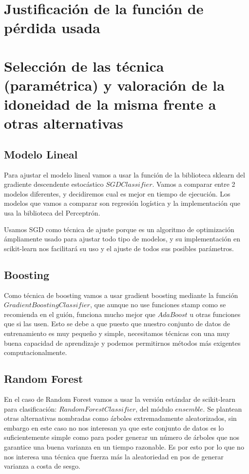 \documentclass{article}
\begin{document}
	
	\section{Justificación de la función de pérdida usada} %
	
	
	
	\section{Selección de las técnica (paramétrica) y valoración de la idoneidad de la misma frente a otras alternativas} %
	\subsection{Modelo Lineal}
	Para ajustar el modelo lineal vamos a usar la función de la biblioteca sklearn del gradiente descendente estocástico $SGDClassifier$. Vamos a comparar entre 2 modelos diferentes, y decidiremos cual es mejor en tiempo de ejecución. Los modelos que vamos a comparar son regresión logística y la implementación que usa la biblioteca del Perceptrón.
	\par 
	Usamos SGD como técnica	de ajuste porque es un algoritmo de optimización ámpliamente usado para ajustar todo tipo de modelos, y su implementación en scikit-learn nos facilitará su uso y el ajuste de todos sus posibles parámetros. 
	\subsection{Boosting}
	Como técnica de boosting vamos a usar gradient boosting mediante la función $GradientBoostingClassifier$, que aunque no use funciones stamp como se recomienda en el guión, funciona mucho mejor que $AdaBoost$ u otras funciones que si las usen. Esto se debe a que puesto que nuestro conjunto de datos de entrenamiento es muy pequeño y simple, necesitamos técnicas con una muy buena capacidad de aprendizaje y podemos permitirnos métodos más exigentes computacionalmente. 
	\subsection{Random Forest}
	En el caso de Random Forest vamos a usar la versión estándar de scikit-learn para clasificación: $RandomForestClassifier$, del módulo $ensemble$. Se plantean otras alternativas nombradas como árboles extremadamente aleatorizados, sin embargo en este caso no nos interesan ya que este conjunto de datos es lo suficientemente simple como para poder generar un número de árboles que nos garantice una buena varianza en un tiempo razonable. Es por esto por lo que no nos interesa una técnica que fuerza más la aleatoriedad en pos de generar varianza a costa de sesgo.
	
\end{document}
